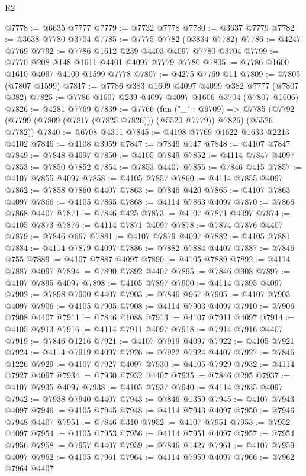 \begin{lexlean}{R2}
\begin{coremodule}
@7778 := @6635 @7777
@7779 := @7732 @7778
@7780 := @3637 @7779
@7782 := @3638 @7780 @3704
@7785 := @7775 @7782 (@3834 @7782)
@7786 := @4247 @7769
@7792 := @7786 @1612 @239 @4403 @4097 @7780 @3704
@7799 := @7770 @208 @148 @1611 @4401 @4097 @7779 @7780
@7805 := @7786 @1600 @1610 @4097 @4100 @1599 @7778
@7807 := @4275 @7769 @11
@7809 := @7805 (@7807 @1599)
@7817 := @7786 @383 @1609 @4097 @4099 @382 @7777 (@7807 @382)
@7825 := @7786 @1607 @239 @4097 @4097 @1606 @3704 (@7807 @1606)
@7826 := @4281 @7769
@7839 := @7766
    (fun ("_" : @6709) =>
    @7785 (@7792 (@7799 (@7809 (@7817 (@7825 @7826))) (@5520 @7779)) @7826) (@5526 @7782))
@7840 := @6708 @4311
@7845 := @4198 @7769 @1622 @1633 @2213 @4102
@7846 := @4108 @3959
@7847 := @7846 @147
@7848 := @4107 @7847
@7849 := @7848 @4097
@7850 := @4105 @7849
@7852 := @4114 @7847 @4097
@7853 := @7850 @7852
@7854 := @7853 @4407
@7855 := @7846 @415
@7857 := @4107 @7855 @4097
@7858 := @4105 @7857
@7860 := @4114 @7855 @4097
@7862 := @7858 @7860 @4407
@7863 := @7846 @420
@7865 := @4107 @7863 @4097
@7866 := @4105 @7865
@7868 := @4114 @7863 @4097
@7870 := @7866 @7868 @4407
@7871 := @7846 @425
@7873 := @4107 @7871 @4097
@7874 := @4105 @7873
@7876 := @4114 @7871 @4097
@7878 := @7874 @7876 @4407
@7879 := @7846 @667
@7881 := @4107 @7879 @4097
@7882 := @4105 @7881
@7884 := @4114 @7879 @4097
@7886 := @7882 @7884 @4407
@7887 := @7846 @755
@7889 := @4107 @7887 @4097
@7890 := @4105 @7889
@7892 := @4114 @7887 @4097
@7894 := @7890 @7892 @4407
@7895 := @7846 @908
@7897 := @4107 @7895 @4097
@7898 := @4105 @7897
@7900 := @4114 @7895 @4097
@7902 := @7898 @7900 @4407
@7903 := @7846 @967
@7905 := @4107 @7903 @4097
@7906 := @4105 @7905
@7908 := @4114 @7903 @4097
@7910 := @7906 @7908 @4407
@7911 := @7846 @1088
@7913 := @4107 @7911 @4097
@7914 := @4105 @7913
@7916 := @4114 @7911 @4097
@7918 := @7914 @7916 @4407
@7919 := @7846 @1216
@7921 := @4107 @7919 @4097
@7922 := @4105 @7921
@7924 := @4114 @7919 @4097
@7926 := @7922 @7924 @4407
@7927 := @7846 @1226
@7929 := @4107 @7927 @4097
@7930 := @4105 @7929
@7932 := @4114 @7927 @4097
@7934 := @7930 @7932 @4407
@7935 := @7846 @295
@7937 := @4107 @7935 @4097
@7938 := @4105 @7937
@7940 := @4114 @7935 @4097
@7942 := @7938 @7940 @4407
@7943 := @7846 @1359
@7945 := @4107 @7943 @4097
@7946 := @4105 @7945
@7948 := @4114 @7943 @4097
@7950 := @7946 @7948 @4407
@7951 := @7846 @310
@7952 := @4107 @7951
@7953 := @7952 @4097
@7954 := @4105 @7953
@7956 := @4114 @7951 @4097
@7957 := @7954 @7956
@7958 := @7957 @4407
@7959 := @7846 @1427
@7961 := @4107 @7959 @4097
@7962 := @4105 @7961
@7964 := @4114 @7959 @4097
@7966 := @7962 @7964 @4407

\end{coremodule}
\end{lexlean}
